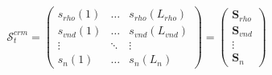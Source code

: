 \[
 \mathcal{S}_t^{crm}   =   \begin{pmatrix}

                      s_{rho}(1) & \ldots & s_{rho}(L_{rho})  \\
                      	 s_{vnd}(1) & \ldots & s_{vnd}(L_{vnd})  \\
                         \vdots & \ddots & \vdots   \\
                         s_n(1) & \ldots & s_n(L_n) 
                        \end{pmatrix}  =\begin{pmatrix}

                          \textbf{S}_{rho}  \\
                          \textbf{S}_{vnd}  \\
                           \vdots \\
                         \textbf{S}_n 
                        \end{pmatrix} \]
                       
